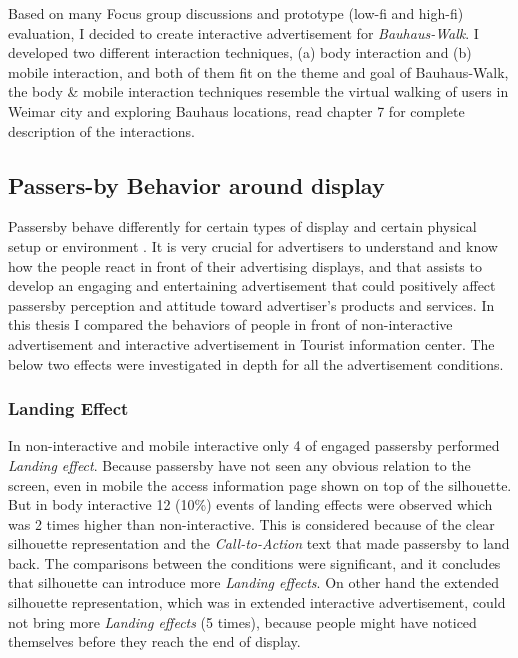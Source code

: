 Based on many Focus group discussions and prototype (low-fi and high-fi) evaluation, I decided to create interactive advertisement for \emph{Bauhaus-Walk}. I developed two different interaction techniques, (a) body interaction and (b) mobile interaction, and both of them fit on the theme and goal of Bauhaus-Walk, the body \& mobile interaction techniques resemble the virtual walking of users in Weimar city and exploring Bauhaus locations, read chapter 7 for complete description of the interactions.


\subsection{Passers-by Behavior around display}
Passersby behave differently for certain types of display\cite{CylindricalScreen}   and certain physical setup or environment \cite{chained_displays, LookingGlass}. It is very crucial for advertisers to understand and know how the people react in front of their advertising displays, and that assists to develop an engaging and entertaining advertisement that could positively affect passersby perception and attitude toward advertiser’s products and services. In this thesis I compared the behaviors of people in front of non-interactive advertisement and interactive advertisement in Tourist information center. The below two effects were investigated in depth for all the advertisement conditions.

\subsubsection{Landing Effect}
In non-interactive and mobile interactive only 4 of engaged passersby performed  \emph{Landing effect}. Because passersby have not seen any obvious  relation to the screen, even in mobile the access information page shown on top of the silhouette. But in body interactive 12 (10\%) events of landing effects were observed which was 2 times higher than non-interactive. This is considered because of the clear silhouette representation and the \emph{Call-to-Action} text that made passersby to land back. The comparisons between the conditions were significant, and it concludes that silhouette can introduce more \emph{Landing effects}. On other hand the extended silhouette representation, which was in extended interactive advertisement, could not bring more \emph{Landing effects} (5 times), because people might have noticed themselves before they reach the end of display.

